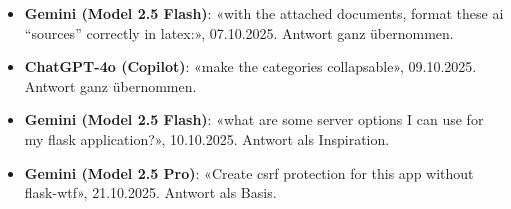 \documentclass[12pt, a4paper]{article}
\begin{document}
\begin{itemize}
    \item \textbf{Gemini (Model 2.5 Flash)}: «with the attached documents, format these ai ``sources'' correctly in latex:», 07.10.2025. Antwort ganz übernommen.
    
    \item \textbf{ChatGPT-4o (Copilot)}: «make the categories collapsable», 09.10.2025. Antwort ganz übernommen.

    \item \textbf{Gemini (Model 2.5 Flash)}: «what are some server options I can use for my flask application?», 10.10.2025. Antwort als Inspiration.

    \item \textbf{Gemini (Model 2.5 Pro)}: «Create csrf protection for this app without flask-wtf», 21.10.2025. Antwort als Basis.
    
\end{itemize}
\end{document}
